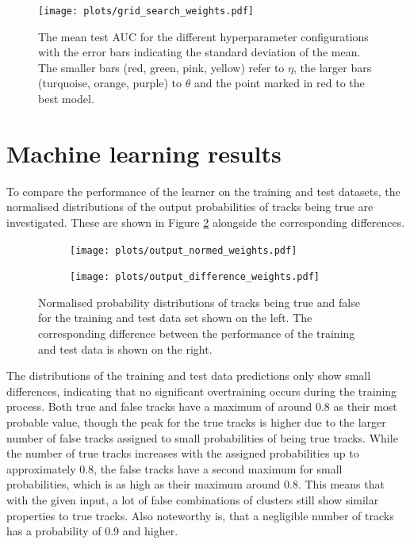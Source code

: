 \begin{figure}[H]
  \centering
  \texttt{[image: plots/grid\_search\_weights.pdf]}
  \caption{The mean test AUC for the different hyperparameter configurations with the error bars indicating the standard deviation of the mean. The
  smaller bars (red, green, pink, yellow) refer to $\eta$, the larger bars (turquoise, orange, purple) to $\theta$ and the point marked in red to the best model.}
  \label{fig:grid}
\end{figure}



\section{Machine learning results}
To compare the performance of the learner on the training and test datasets, the normalised distributions of the output probabilities of tracks being true are investigated.
These are shown in Figure \ref{fig:output} alongside the corresponding differences.

\begin{figure}
  \hspace{-0.45cm}
  \begin{subfigure}{0.51\textwidth}
      \centering
      \texttt{[image: plots/output\_normed\_weights.pdf]}
  \end{subfigure}
  \begin{subfigure}{0.51\textwidth}
      \hspace{-0.15cm}
      \texttt{[image: plots/output\_difference\_weights.pdf]}
  \end{subfigure}
  \caption{Normalised probability distributions of tracks being true and false for the training and test data set shown on the left.
  The corresponding difference between the performance of the training and test data is shown on the right.}
  \label{fig:output}
\end{figure}

The distributions of the training and test data predictions only show small differences, indicating that no significant overtraining occurs during the training process.
Both true and false tracks have a maximum of around 0.8 as their most probable value, though the peak for the true tracks is higher due to the larger number
of false tracks assigned to small probabilities of being true tracks. While the number of true tracks increases with the assigned probabilities up to
approximately 0.8, the false tracks have a second maximum for small probabilities, which is as high as their maximum around 0.8.
This means that
with the given input, a lot of false combinations of clusters still show similar properties to true tracks.
Also noteworthy is, that a negligible number of tracks has a probability of 0.9 and higher.

